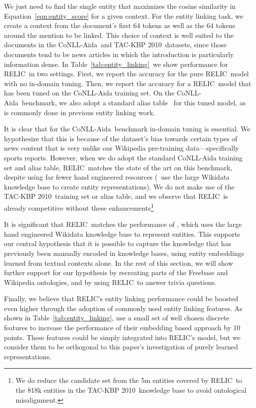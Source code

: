\documentclass{article} \usepackage{iclr2020_conference,times}
\newcommand{\ack}{RELIC\xspace}
\newcommand{\tac}{TAC-KBP 2010}
\newcommand{\conll}{CoNLL-Aida}
\begin{document}
We just need to find the single entity that maximizes the cosine similarity in Equation~\ref{eqn:entity_score} for a given context.
For the entity linking task, we create a context from the document's first 64 tokens as well as the 64 tokens around the mention to be linked.
This choice of context is well suited to the documents in the \conll~and \tac~datasets, since those documents tend to be news articles in which the introduction is particularly information dense.
In Table~\ref{tab:entity_linking}~we show performance for \ack~in two settings. 
First, we report the accuracy for the pure \ack~model with no in-domain tuning.
Then, we report the accuracy for a \ack~model that has been tuned on the CoNLL-Aida training set. 
On the \conll~benchmark, we also adopt a standard alias table \citep{pprpershina}~for this tuned model, as is commonly done in previous entity linking work. 

It is clear that for the \conll~benchmark in-domain tuning is essential.
We hypothesize that this is because of the dataset's bias towards certain types of news content that is very unlike our Wikipedia pre-training data---specifically sports reports. However, when we do adopt the standard CoNLL-Aida training set and alias table, \ack~matches the state of the art on this benchmark, despite using far fewer hand engineered resources (\cite{Raiman2018-hm}~use the large Wikidata knowledge base to create entity representations).
We do not make use of the \tac~training set or alias table, and we observe that \ack~is already competitive without these enhancements\footnote{We do reduce the candidate set from the 5m entities covered by \ack~to the 818k entities in the \tac~knowledge base to avoid ontological misalignment.}

It is significant that \ack~matches the performance of \cite{Raiman2018-hm}, which uses the large hand engineered Wikidata knowledge base to represent entities.
This supports our central hypothesis that it is possible to capture the knowledge that has previously been manually encoded in knowledge bases, using entity embeddings learned from textual contexts alone. In the rest of this section, we will show further support for our hypothesis by recreating parts of the Freebase and Wikipedia ontologies, and by using \ack~to answer trivia questions.

Finally, we believe that \ack's entity linking performance could be boosted even higher through the adoption of commonly used entity linking features.
As shown in Table~\ref{tab:entity_linking}, \cite{yamada2016joint} use a small set of well chosen discrete features to increase the performance of their embedding based approach by 10 points.
These features could be simply integrated into \ack's model, but we consider them to be orthogonal to this paper's investigation of purely learned representations.
\end{document}
